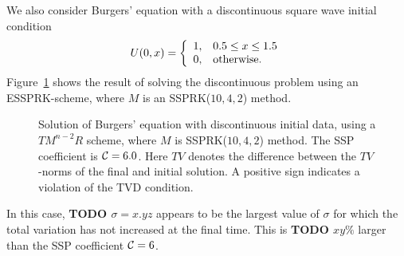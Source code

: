 We also consider Burgers' equation with a discontinuous
square wave initial condition
\begin{equation*}%
    U(0,x)  = \left\{
                \begin{array}{ll}
                  1, & \hbox{$0.5 \leq x \leq 1.5$} \\
                  0, & \hbox{otherwise.}
                \end{array}
              \right.
\end{equation*}
Figure~\ref{fig:burgers_discont} shows the result of solving the 
discontinuous problem using an ESSPRK-scheme, where $M$ is an 
SSPRK($10,4,2$) method.
\begin{figure}
    \centering
    \quad
    \caption{Solution of Burgers' equation with discontinuous initial data, using a 
    $TM^{n-2}R$ scheme, where $M$ is SSPRK($10,4,2$) method. 
    The SSP coefficient is $ \mathcal{C} = 6.0$.
    Here $TV$ denotes the difference between the $TV$-norms of the final and 
    initial solution.
    A positive sign indicates a violation of the TVD condition.}
    \label{fig:burgers_discont}
\end{figure}
In this case, \textbf{\red TODO $\sigma = x.yz$} appears to be the
largest value of $\sigma$ for which the total variation has not
increased at the final time.
This is \textbf{\red TODO $xy\%$} larger than the SSP coefficient
$\mathcal{C} = 6$.

